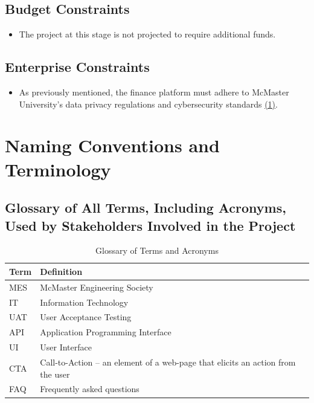 \documentclass[12pt]{article}
\begin{document}
\subsection{Budget Constraints}
\begin{itemize}
    \item The project at this stage is not projected to require additional funds.
\end{itemize}

\subsection{Enterprise Constraints}
\begin{itemize}
    \item As previously mentioned, the finance platform must adhere to McMaster University’s data privacy regulations and cybersecurity standards \hyperlink{Ref1}{(1)}.
\end{itemize}

\section{Naming Conventions and Terminology}
\subsection{Glossary of All Terms, Including Acronyms, Used by Stakeholders Involved in the Project}
\begin{table}[h]
    \centering
    \begin{tabular}{|>{\raggedright}p{3cm}|>{\raggedright\arraybackslash}p{10cm}|}
        \hline
        \textbf{Term} & \textbf{Definition} \\
        \hline
        MES & McMaster Engineering Society \\
        \hline
        IT & Information Technology \\
        \hline
        UAT & User Acceptance Testing \\
        \hline
        API & Application Programming Interface \\
        \hline
        UI & User Interface \\
        \hline
        CTA & Call-to-Action – an element of a web-page that elicits an action from the user \\
        \hline
        FAQ & Frequently asked questions \\
        \hline
    \end{tabular}
    \caption{Glossary of Terms and Acronyms}
    \label{tab:glossary}
\end{table}
\end{document}
